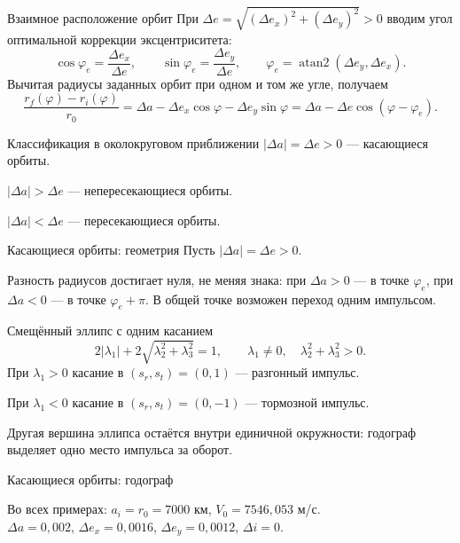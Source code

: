 \documentclass[11pt,aspectratio=169,t]{beamer}
\newcommand{\figcaption}[1]{{\usebeamerfont{caption}\color{coursemuted}#1\par}}
\newcommand{\derivationmathspacing}{%
  \setlength{\abovedisplayskip}{2pt}%
  \setlength{\belowdisplayskip}{3pt}%
  \setlength{\abovedisplayshortskip}{2pt}%
  \setlength{\belowdisplayshortskip}{2pt}%
  \setlength{\jot}{2pt}}
\begin{document}
\begin{frame}{Взаимное расположение орбит}
\relax
При $\Delta e=\sqrt{(\Delta e_x)^2+(\Delta e_y)^2}>0$ вводим угол
оптимальной коррекции эксцентриситета:
\derivationmathspacing
\[
 \cos\varphi_e=\frac{\Delta e_x}{\Delta e},\qquad
 \sin\varphi_e=\frac{\Delta e_y}{\Delta e},\qquad
 \varphi_e=\operatorname{atan2}(\Delta e_y,\Delta e_x).
\]
Вычитая радиусы заданных орбит при одном и том же угле, получаем
\[
 \frac{r_f(\varphi)-r_i(\varphi)}{r_0}
 =\Delta a-\Delta e_x\cos\varphi-\Delta e_y\sin\varphi
 =\Delta a-\Delta e\cos(\varphi-\varphi_e).
\]
\begin{block}{Классификация в околокруговом приближении}
$|\Delta a|=\Delta e>0$ --- касающиеся орбиты.\par
$|\Delta a|>\Delta e$ --- непересекающиеся орбиты.\par
$|\Delta a|<\Delta e$ --- пересекающиеся орбиты.
\end{block}
\end{frame}

\begin{frame}{Касающиеся орбиты: геометрия}
\relax
Пусть $|\Delta a|=\Delta e>0$.
{\justifying
Разность радиусов достигает нуля, не меняя знака:
при $\Delta a>0$ --- в точке $\varphi_e$,
при $\Delta a<0$ --- в точке $\varphi_e+\pi$.
В общей точке возможен переход одним импульсом.
\par}
\begin{block}{Смещённый эллипс с одним касанием}
\derivationmathspacing
\[
 2|\lambda_1|+2\sqrt{\lambda_2^2+\lambda_3^2}=1,\qquad
 \lambda_1\ne0,\quad\lambda_2^2+\lambda_3^2>0.
\]
При $\lambda_1>0$ касание в $(s_r,s_t)=(0,1)$ --- разгонный импульс.\par
При $\lambda_1<0$ касание в $(s_r,s_t)=(0,-1)$ --- тормозной импульс.
\end{block}
{\justifying
Другая вершина эллипса остаётся внутри единичной окружности:
годограф выделяет одно место импульса за оборот.
\par}
\end{frame}

\begin{frame}{Касающиеся орбиты: годограф}
\relax
\centering

\par
\figcaption{Во всех примерах: $a_i=r_0=7000$ км, $V_0=7546{,}053$ м/с.\\
$\Delta a=0{,}002$, $\Delta e_x=0{,}0016$, $\Delta e_y=0{,}0012$, $\Delta i=0$.}
\end{frame}
\end{document}
